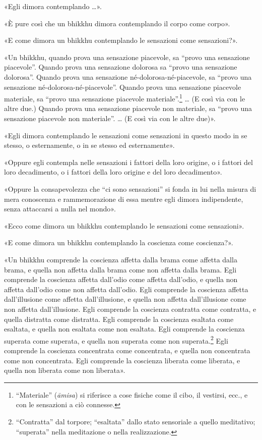 «Egli dimora contemplando …».

«È pure così che un bhikkhu dimora contemplando il corpo come corpo».

«E come dimora un bhikkhu contemplando le sensazioni come sensazioni?».

«Un bhikkhu, quando prova una sensazione piacevole, sa “provo una sensazione
piacevole”. Quando prova una sensazione dolorosa sa “provo una sensazione
dolorosa”. Quando prova una sensazione né-dolorosa-né-piacevole, sa “provo una
sensazione né-dolorosa-né-piacevole”. Quando prova una sensazione piacevole
materiale, sa “provo una sensazione piacevole materiale”.\footnote{“Materiale”
  (\emph{āmisa}) si riferisce a cose fisiche come il cibo, il vestirsi, ecc., e
  con le sensazioni a ciò connesse.} … (E così via con le altre due.) Quando
prova una sensazione piacevole non materiale, sa “provo una sensazione piacevole
non materiale”. … (E così via con le altre due)».

«Egli dimora contemplando le sensazioni come sensazioni in questo modo in se
stesso, o esternamente, o in se stesso ed esternamente».

«Oppure egli contempla nelle sensazioni i fattori della loro origine, o i
fattori del loro decadimento, o i fattori della loro origine e del loro
decadimento».

«Oppure la consapevolezza che “ci sono sensazioni” si fonda in lui nella misura
di mera conoscenza e rammemorazione di essa mentre egli dimora indipendente,
senza attaccarsi a nulla nel mondo».

«Ecco come dimora un bhikkhu contemplando le sensazioni come sensazioni».

«E come dimora un bhikkhu contemplando la coscienza come coscienza?».

\label{pag272}%
«Un bhikkhu comprende la coscienza affetta dalla brama come affetta dalla brama,
e quella non affetta dalla brama come non affetta dalla brama. Egli comprende la
coscienza affetta dall’odio come affetta dall’odio, e quella non affetta
dall’odio come non affetta dall’odio. Egli comprende la coscienza affetta
dall’illusione come affetta dall’illusione, e quella non affetta dall’illusione
come non affetta dall’illusione. Egli comprende la coscienza contratta come
contratta, e quella distratta come distratta. Egli comprende la coscienza
esaltata come esaltata, e quella non esaltata come non esaltata. Egli comprende
la coscienza superata come superata, e quella non superata come non
superata.\footnote{“Contratta” dal torpore; “esaltata” dallo stato sensoriale a
  quello meditativo; “superata” nella meditazione o nella realizzazione.} Egli
comprende la coscienza concentrata come concentrata, e quella non concentrata
come non concentrata. Egli comprende la coscienza liberata come liberata, e
quella non liberata come non liberata».

